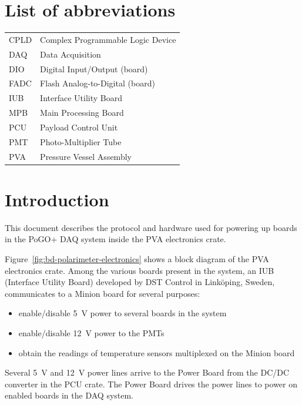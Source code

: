 \documentclass[a4paper,11pt]{article}
\begin{document}
\section*{List of abbreviations}
\begin{tabular}{l l}
CPLD & Complex Programmable Logic Device \\
DAQ & Data Acquisition \\
DIO & Digital Input/Output (board) \\
FADC & Flash Analog-to-Digital (board) \\
IUB & Interface Utility Board \\
MPB & Main Processing Board \\
PCU & Payload Control Unit \\
PMT & Photo-Multiplier Tube \\
PVA & Pressure Vessel Assembly \\
\end{tabular}

\pagebreak
\section{Introduction}
\label{sec:intro}

This document describes the protocol and hardware used for powering up boards in the
PoGO+ DAQ system inside the PVA electronics crate.

Figure~\ref{fig:bd-polarimeter-electronics} shows a block diagram of the PVA electronics
crate. Among the various boards present in the system, an IUB (Interface Utility 
Board) developed by DST Control in Link\"{o}ping, Sweden, communicates to a Minion 
board for several purposes:

\begin{itemize}
  \item enable/disable 5~V power to several boards in the system
  \item enable/disable 12~V power to the PMTs
  \item obtain the readings of temperature sensors multiplexed on the Minion board
\end{itemize}

Several 5~V and 12~V power lines arrive to the Power Board from the DC/DC converter in the 
PCU crate. The Power Board drives the power lines to power on enabled boards in the DAQ 
system.
\end{document}
